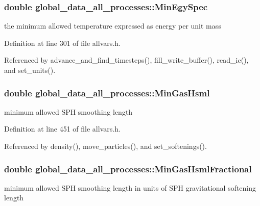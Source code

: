 \hypertarget{structglobal__data__all__processes_ae298f2b76a8f1d0b932bee24c28987cf}{
\subsubsection[{MinEgySpec}]{\setlength{\rightskip}{0pt plus 5cm}double {\bf global\_\-data\_\-all\_\-processes::MinEgySpec}}}
\label{structglobal__data__all__processes_ae298f2b76a8f1d0b932bee24c28987cf}
the minimum allowed temperature expressed as energy per unit mass 

Definition at line 301 of file allvars.h.



Referenced by advance\_\-and\_\-find\_\-timesteps(), fill\_\-write\_\-buffer(), read\_\-ic(), and set\_\-units().

\hypertarget{structglobal__data__all__processes_aec92c94dd2a1d0f0e1ad56f2e790384a}{
\subsubsection[{MinGasHsml}]{\setlength{\rightskip}{0pt plus 5cm}double {\bf global\_\-data\_\-all\_\-processes::MinGasHsml}}}
\label{structglobal__data__all__processes_aec92c94dd2a1d0f0e1ad56f2e790384a}
minimum allowed SPH smoothing length 

Definition at line 451 of file allvars.h.



Referenced by density(), move\_\-particles(), and set\_\-softenings().

\hypertarget{structglobal__data__all__processes_acddf5d973c6847405b85f4531d5b7510}{
\subsubsection[{MinGasHsmlFractional}]{\setlength{\rightskip}{0pt plus 5cm}double {\bf global\_\-data\_\-all\_\-processes::MinGasHsmlFractional}}}
\label{structglobal__data__all__processes_acddf5d973c6847405b85f4531d5b7510}
minimum allowed SPH smoothing length in units of SPH gravitational softening length 

